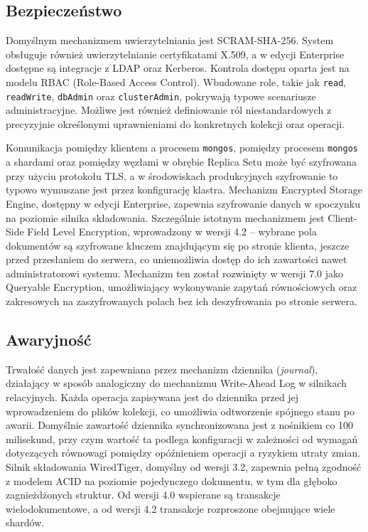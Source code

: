 \subsection{Bezpieczeństwo}

Domyślnym mechanizmem uwierzytelniania jest SCRAM-SHA-256. System obsługuje
również uwierzytelnianie certyfikatami X.509, a w edycji Enterprise dostępne
są integracje z LDAP oraz Kerberos. Kontrola dostępu oparta jest na modelu
RBAC (Role-Based Access Control). Wbudowane role, takie jak \texttt{read},
\texttt{readWrite}, \texttt{dbAdmin} oraz \texttt{clusterAdmin}, pokrywają
typowe scenariusze administracyjne. Możliwe jest również definiowanie ról
niestandardowych z precyzyjnie określonymi uprawnieniami do konkretnych
kolekcji oraz operacji.

Komunikacja pomiędzy klientem a procesem \texttt{mongos}, pomiędzy procesem
\texttt{mongos} a shardami oraz pomiędzy węzłami w obrębie Replica Setu może
być szyfrowana przy użyciu protokołu TLS, a w środowiskach produkcyjnych
szyfrowanie to typowo wymuszane jest przez konfigurację klastra. Mechanizm
Encrypted Storage Engine, dostępny w edycji Enterprise, zapewnia szyfrowanie
danych w spoczynku na poziomie silnika składowania. Szczególnie istotnym
mechanizmem jest Client-Side Field Level Encryption, wprowadzony w wersji
4.2 -- wybrane pola dokumentów są szyfrowane kluczem znajdującym się po
stronie klienta, jeszcze przed przesłaniem do serwera, co uniemożliwia
dostęp do ich zawartości nawet administratorowi systemu. Mechanizm ten
został rozwinięty w wersji 7.0 jako Queryable Encryption, umożliwiający
wykonywanie zapytań równościowych oraz zakresowych na zaszyfrowanych polach
bez ich deszyfrowania po stronie serwera.

\subsection{Awaryjność}

Trwałość danych jest zapewniana przez mechanizm dziennika (\textit{journal}),
działający w sposób analogiczny do mechanizmu Write-Ahead Log w silnikach
relacyjnych. Każda operacja zapisywana jest do dziennika przed jej
wprowadzeniem do plików kolekcji, co umożliwia odtworzenie spójnego stanu
po awarii. Domyślnie zawartość dziennika synchronizowana jest z nośnikiem
co 100 milisekund, przy czym wartość ta podlega konfiguracji w zależności
od wymagań dotyczących równowagi pomiędzy opóźnieniem operacji a ryzykiem
utraty zmian. Silnik składowania WiredTiger, domyślny od wersji 3.2, zapewnia
pełną zgodność z modelem ACID na poziomie pojedynczego dokumentu, w tym
dla głęboko zagnieżdżonych struktur. Od wersji 4.0 wspierane są transakcje
wielodokumentowe, a od wersji 4.2 transakcje rozproszone obejmujące
wiele shardów.


